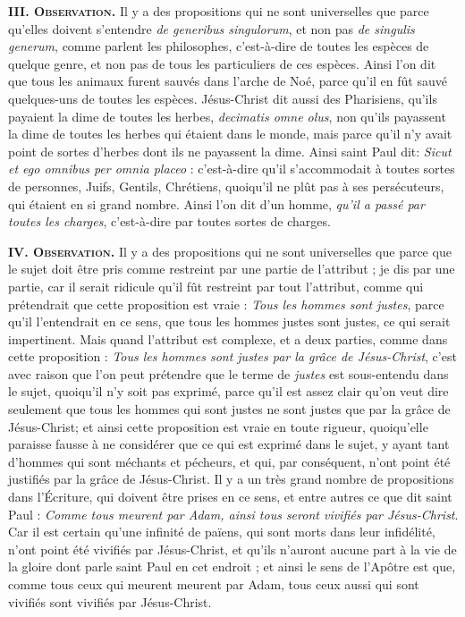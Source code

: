 \bigbreak
{\bfseries\scshape III. Observation.} Il y a des propositions qui ne sont universelles que parce qu'elles doivent s'entendre \emph{de generibus singulorum}, et non pas \emph{de singulis generum}, comme parlent les philosophes, c'est-à-dire de toutes les espèces de quelque genre, et non pas de tous les particuliers de ces espèces. Ainsi l'on dit que tous les animaux furent sauvés dans l'arche de Noé, parce qu'il en fût sauvé quelques-uns de toutes les espèces. Jésus-Christ dit aussi des Pharisiens, qu'ils payaient la dime de toutes les herbes, \emph{decimatis omne olus}, non qu'ils payassent la dime de toutes les herbes qui étaient dans le monde, mais parce qu'il n'y avait point de sortes d'herbes dont ils ne payassent la dime. Ainsi saint Paul dit: \emph{Sicut et ego omnibus per omnia placeo} : c'est-à-dire qu'il s'accommodait à toutes sortes de personnes, Juifs, Gentils, Chrétiens, quoiqu'il ne plût pas à ses persécuteurs, qui étaient en si grand nombre. Ainsi l'on dit d'un homme, \emph{qu'il a passé par toutes les charges}, c'est-à-dire par toutes sortes de charges.

\bigbreak
{\bfseries\scshape IV. Observation.} Il y a des propositions qui ne sont universelles que parce que le sujet doit être pris comme restreint par une partie de l'attribut ; je dis par une partie, car il serait ridicule qu'il fût restreint par tout l'attribut, comme qui prétendrait que cette proposition est vraie : \emph{Tous les hommes sont justes}, parce qu'il l'entendrait en ce sens, que tous les hommes justes sont justes, ce qui serait impertinent. Mais quand l'attribut est complexe, et a deux parties, comme dans cette proposition : \emph{Tous les hommes sont justes par la grâce de Jésus-Christ}, c'est avec raison que l'on peut prétendre que le terme de \emph{justes} est sous-entendu dans le sujet, quoiqu'il n'y soit pas exprimé, parce qu'il est assez clair qu'on veut dire seulement que tous les hommes qui sont justes ne sont justes que par la grâce de Jésus-Christ; et ainsi cette proposition est vraie en toute rigueur, quoiqu'elle paraisse fausse à ne considérer que ce qui est exprimé dans le sujet, y ayant tant d'hommes qui sont méchants et pécheurs, et qui, par conséquent, n'ont point été justifiés par la grâce de Jésus-Christ. Il y a un très grand nombre de propositions dans l'Écriture, qui doivent être prises en ce sens, et entre autres ce que dit saint Paul : \emph{Comme tous meurent par Adam, ainsi tous seront vivifiés par Jésus-Christ}. Car il est certain qu'une infinité de païens, qui sont morts dans leur infidélité, n'ont point été vivifiés par Jésus-Christ, et qu'ils n'auront aucune part à la vie de la gloire dont parle saint Paul en cet endroit ; et ainsi le sens de l'Apôtre est que, comme tous ceux qui meurent meurent par Adam, tous ceux aussi qui sont vivifiés sont vivifiés par Jésus-Christ.

